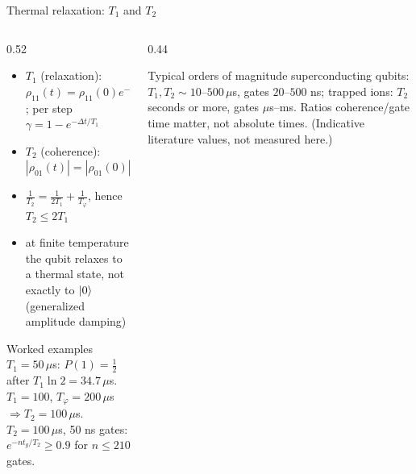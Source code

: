 \documentclass[aspectratio=169,11pt]{beamer}
\begin{document}
\begin{frame}[label=fT1T2]{Thermal relaxation: $T_1$ and $T_2$}
  \begin{columns}[T]
    \begin{column}{0.52\textwidth}
      \small
      \begin{itemize}\itemsep2pt
        \item $T_1$ (relaxation): $\rho_{11}(t) = \rho_{11}(0)e^{-t/T_1}$; per step $\gamma = 1 - e^{-\Delta t/T_1}$
        \item $T_2$ (coherence): $|\rho_{01}(t)| = |\rho_{01}(0)|e^{-t/T_2}$
        \item $\frac{1}{T_2} = \frac{1}{2T_1} + \frac{1}{T_\varphi}$, hence $T_2 \le 2T_1$
        \item at finite temperature the qubit relaxes to a thermal state, not exactly to $\ket0$ (generalized amplitude damping)
      \end{itemize}
      \begin{exampleblock}{Worked examples}
        \scriptsize $T_1 = 50\,\mu$s: $P(1) = \frac12$ after $T_1\ln2 = 34.7\,\mu$s.\\
        $T_1 = 100$, $T_\varphi = 200\,\mu$s $\Rightarrow T_2 = 100\,\mu$s.\\
        $T_2 = 100\,\mu$s, 50 ns gates: $e^{-nt_g/T_2} \ge 0.9$ for $n \le 210$ gates.
      \end{exampleblock}
    \end{column}
    \begin{column}{0.44\textwidth}
      \begin{block}{Typical orders of magnitude}
        \scriptsize superconducting qubits: $T_1, T_2 \sim 10$--$500\,\mu$s, gates $20$--$500$ ns; trapped ions: $T_2$ seconds or more, gates $\mu$s--ms.
        Ratios coherence/gate time matter, not absolute times. (Indicative literature values, not measured here.)
      \end{block}
    \end{column}
  \end{columns}
\end{frame}
\end{document}

